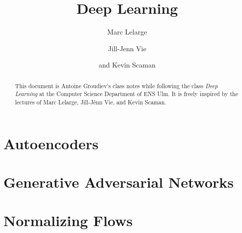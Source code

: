 \documentclass[toc, titlepaged]{../cs-classes/cs-classes}
\title{Deep Learning}
\author{Marc Lelarge\and Jill-Jenn Vie\and and Kevin Scaman}
\begin{document}
\begin{abstract}
    This document is Antoine Groudiev's class notes while following the class \emph{Deep Learning} at the Computer Science Department of ENS Ulm. It is freely inspired by the lectures of Marc Lelarge, Jill-Jênn Vie, and Kevin Scaman. 
\end{abstract}





% 







\section{Autoencoders}

\section{Generative Adversarial Networks}

\section{Normalizing Flows}
\end{document}
